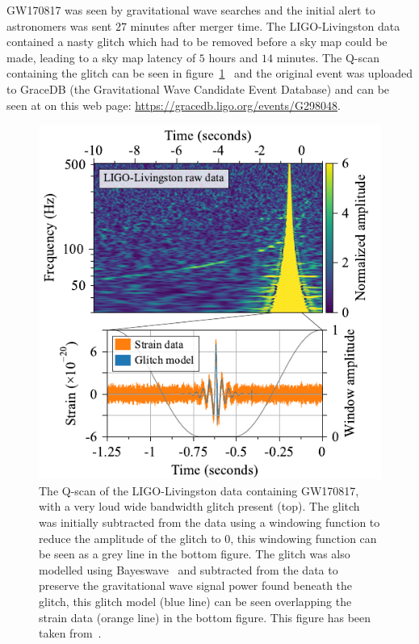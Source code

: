 GW170817 was seen by gravitational wave searches and the initial alert to astronomers was sent $27$ minutes after merger time. The LIGO-Livingston data contained a nasty glitch which had to be removed before a sky map could be made, leading to a sky map latency of $5$ hours and $14$ minutes. The Q-scan containing the glitch can be seen in figure~\ref{6:fig:gw170817_glitch}~\cite{GW170817:2017} and the original event was uploaded to GraceDB (the Gravitational Wave Candidate Event Database) and can be seen at on this web page: \href{https://gracedb.ligo.org/events/G298048}{https://gracedb.ligo.org/events/G298048}.
%
\begin{figure}
    \centering
    \includegraphics[width=1.0\linewidth]{images/6_earlywarning/gw170817/GW170817_glitch_subtraction.pdf}
    \caption{The Q-scan of the LIGO-Livingston data containing GW170817, with a very loud wide bandwidth glitch present (top). The glitch was initially subtracted from the data using a windowing function to reduce the amplitude of the glitch to $0$, this windowing function can be seen as a grey line in the bottom figure. The glitch was also modelled using Bayeswave~\cite{BayesWave:2015} and subtracted from the data to preserve the gravitational wave signal power found beneath the glitch, this glitch model (blue line) can be seen overlapping the strain data (orange line) in the bottom figure. This figure has been taken from~\cite{GW170817:2017}.}
    \label{6:fig:gw170817_glitch}
\end{figure}
%

